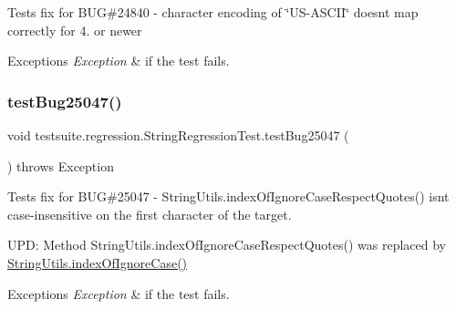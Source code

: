 Tests fix for B\+UG\#24840 -\/ character encoding of \char`\"{}\+U\+S-\/\+A\+S\+C\+I\+I\char`\"{} doesn\textquotesingle{}t map correctly for 4. or newer


\begin{DoxyExceptions}{Exceptions}
{\em Exception} & if the test fails. \\
\hline
\end{DoxyExceptions}
\mbox{\label{classtestsuite_1_1regression_1_1_string_regression_test_a310d7878e44bc9bf13daa040be2bb847}} 
\subsubsection{\texorpdfstring{test\+Bug25047()}{testBug25047()}}
{\footnotesize\ttfamily void testsuite.\+regression.\+String\+Regression\+Test.\+test\+Bug25047 (\begin{DoxyParamCaption}{ }\end{DoxyParamCaption}) throws Exception}

Tests fix for B\+UG\#25047 -\/ String\+Utils.\+index\+Of\+Ignore\+Case\+Respect\+Quotes() isn\textquotesingle{}t case-\/insensitive on the first character of the target.

U\+PD\+: Method String\+Utils.\+index\+Of\+Ignore\+Case\+Respect\+Quotes() was replaced by \mbox{\hyperlink{classcom_1_1mysql_1_1cj_1_1util_1_1_string_utils_a04e388c77ef24c2d95cdc76b3aef7be9}{String\+Utils.\+index\+Of\+Ignore\+Case()}}


\begin{DoxyExceptions}{Exceptions}
{\em Exception} & if the test fails. \\
\hline
\end{DoxyExceptions}
\mbox{\label{classtestsuite_1_1regression_1_1_string_regression_test_a7e24a2a41964d76d3b5b82b5a064d820}} 
